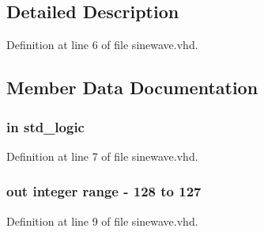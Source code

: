 \subsection{Detailed Description}


Definition at line 6 of file sinewave.\+vhd.



\subsection{Member Data Documentation}
\hypertarget{classsinewave_a4a4609c199d30b3adebbeb3a01276ec5}{}
\subsubsection[{clk}]{ {\bfseries \textcolor{keywordflow}{in}\textcolor{vhdlchar}{ }} {\bfseries \textcolor{comment}{std\+\_\+logic}\textcolor{vhdlchar}{ }} \hspace{0.3cm}{\ttfamily [Port]}}\label{classsinewave_a4a4609c199d30b3adebbeb3a01276ec5}


Definition at line 7 of file sinewave.\+vhd.

\hypertarget{classsinewave_a6f923bb55dbbef4e48f6ae28e0588faf}{}
\subsubsection[{dataout}]{ {\bfseries \textcolor{keywordflow}{out}\textcolor{vhdlchar}{ }} {\bfseries \textcolor{comment}{integer}\textcolor{vhdlchar}{ }\textcolor{vhdlchar}{ }\textcolor{vhdlchar}{ }\textcolor{keywordflow}{range}\textcolor{vhdlchar}{ }\textcolor{vhdlchar}{-\/}\textcolor{vhdlchar}{ } \textcolor{vhdldigit}{128} \textcolor{vhdlchar}{ }\textcolor{keywordflow}{to}\textcolor{vhdlchar}{ }\textcolor{vhdlchar}{ } \textcolor{vhdldigit}{127} \textcolor{vhdlchar}{ }} \hspace{0.3cm}{\ttfamily [Port]}}\label{classsinewave_a6f923bb55dbbef4e48f6ae28e0588faf}


Definition at line 9 of file sinewave.\+vhd.

\hypertarget{classsinewave_ae4f03c286607f3181e16b9aa12d0c6d4}{}
\subsubsection[{I\+E\+E\+E}]{\hspace{0.3cm}{\ttfamily [Library]}}\label{classsinewave_ae4f03c286607f3181e16b9aa12d0c6d4}


